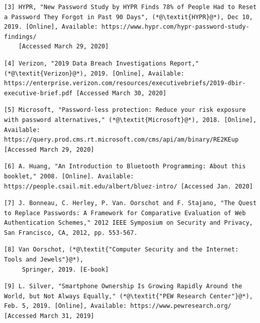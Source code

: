 \documentclass[letterpaper,twocolumn,10pt]{article}
\begin{document}
{{{\small
\begin{lstlisting}
[3] HYPR, "New Password Study by HYPR Finds 78% of People Had to Reset a Password They Forgot in Past 90 Days", (*@\textit{HYPR}@*), Dec 10, 2019. [Online], Available: https://www.hypr.com/hypr-password-study-findings/ 
    [Accessed March 29, 2020]
\end{lstlisting}
}

{\small
\begin{lstlisting}
[4] Verizon, "2019 Data Breach Investigations Report," (*@\textit{Verizon}@*), 2019. [Online], Available: https://enterprise.verizon.com/resources/executivebriefs/2019-dbir-executive-brief.pdf [Accessed March 30, 2020]
\end{lstlisting}
}

{\small
\begin{lstlisting}
[5] Microsoft, "Password-less protection: Reduce your risk exposure with password alternatives," (*@\textit{Microsoft}@*), 2018. [Online], Available: https://query.prod.cms.rt.microsoft.com/cms/api/am/binary/RE2KEup [Accessed March 29, 2020]
\end{lstlisting}
}

{\small
\begin{lstlisting}
[6] A. Huang, "An Introduction to Bluetooth Programming: About this booklet," 2008. [Online]. Available: https://people.csail.mit.edu/albert/bluez-intro/ [Accessed Jan. 2020]
\end{lstlisting}
}

{\small
\begin{lstlisting}
[7] J. Bonneau, C. Herley, P. Van. Oorschot and F. Stajano, "The Quest to Replace Passwords: A Framework for Comparative Evaluation of Web Authentication Schemes," 2012 IEEE Symposium on Security and Privacy, San Francisco, CA, 2012, pp. 553-567.
\end{lstlisting}
}

{\small
{}
\begin{lstlisting}
[8] Van Oorschot, (*@\textit{"Computer Security and the Internet: Tools and Jewels"}@*),
     Springer, 2019. [E-book]
\end{lstlisting}
}

{\small
\begin{lstlisting}
[9] L. Silver, "Smartphone Ownership Is Growing Rapidly Around the World, but Not Always Equally," (*@\textit{"PEW Research Center"}@*), Feb. 5, 2019. [Online], Available: https://www.pewresearch.org/ [Accessed March 31, 2019]
\end{lstlisting}
}

}}
\end{document}
